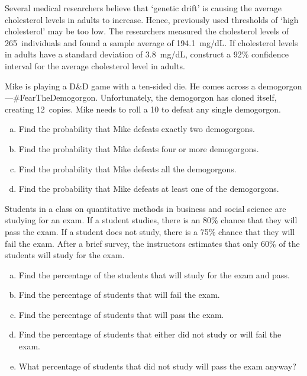 \documentclass[12pt,letterpaper]{exam}
\begin{document}
\begin{questions}
\newpage
\question[10] Several medical researchers believe that `genetic drift' is causing the average cholesterol levels in adults to increase. Hence, previously used thresholds of `high cholesterol' may be too low. The researchers measured the cholesterol levels of 265~individuals and found a sample average of 194.1~mg/dL. If cholesterol levels in adults have a standard deviation of 3.8~mg/dL, construct a 92\% confidence interval for the average cholesterol level in adults. \pvspace{1.5cm}



\newpage
\question[10] Mike is playing a D\&D game with a ten-sided die. He comes across a demogorgon---\#FearTheDemogorgon. Unfortunately, the demogorgon has cloned itself, creating 12~copies. Mike needs to roll a 10 to defeat any single demogorgon. 
	\begin{enumerate}[(a)]
	\item Find the probability that Mike defeats exactly two demogorgons.
	\item Find the probability that Mike defeats four or more demogorgons.
	\item Find the probability that Mike defeats all the demogorgons.
	\item Find the probability that Mike defeats at least one of the demogorgons. 
	\end{enumerate}



\newpage
\question[15] Students in a class on quantitative methods in business and social science are studying for an exam. If a student studies, there is an 80\% chance that they will pass the exam. If a student does not study, there is a 75\% chance that they will fail the exam. After a brief survey, the instructors estimates that only 60\% of the students will study for the exam. 
	\begin{enumerate}[(a)]
	\item Find the percentage of the students that will study for the exam and pass.
	\item Find the percentage of students that will fail the exam. 
	\item Find the percentage of students that will pass the exam. 
	\item Find the percentage of students that either did not study or will fail the exam.
	\item What percentage of students that did not study will pass the exam anyway?
	\end{enumerate}




\end{questions}
\end{document}
